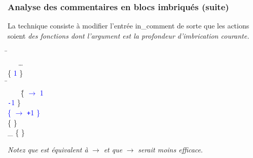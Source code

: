 %
\begin{frame}
\frametitle{Analyse des commentaires en blocs imbriqués (suite)}

La technique consiste à modifier l'entrée \textsf{in\_comment} de
sorte que les actions soient \emph{des fonctions dont l'argument est
la profondeur d'imbrication courante.}
{\small
\begin{tabbing}
\Xrule \=  \equal \Xparse\\
\> \ \ \ \ldots\\
\> \vbar{} \str{/*} \{   \textcolor{blue}{\num{1}} \}\\
\Xand \=  \equal \Xparse\\
\> \ \ \ \str{*/} \= \{ \textcolor{blue}{\Xfun {} \(\rightarrow\)} \=
\textcolor{blue}{\Xif {} \equal \num{1} \Xthen}  \\
\> \> \> \textcolor{blue}{\Xelse {} 
\lpar{}\texttt{-}\num{1}\rpar{}} \}\\
\> \textcolor{blue}{\vbar{} \str{/*}} \> \textcolor{blue}{\{ \Xfun {}
  \(\rightarrow\)  
  \lpar{}\texttt{+}\num{1}\rpar{} \}}\\
\> \vbar{}  \> \{   \}\\
\> \vbar{} {\LARGE \_} \> \{   \}
\end{tabbing}
}
\emph{Notez que} {\small {} } \emph{est
équivalent à} {\small \Xfun {} \(\rightarrow\)
  } \emph{et que} {\small \Xfun
{} \(\rightarrow\)  }
\emph{serait moins efficace}.

\end{frame}

